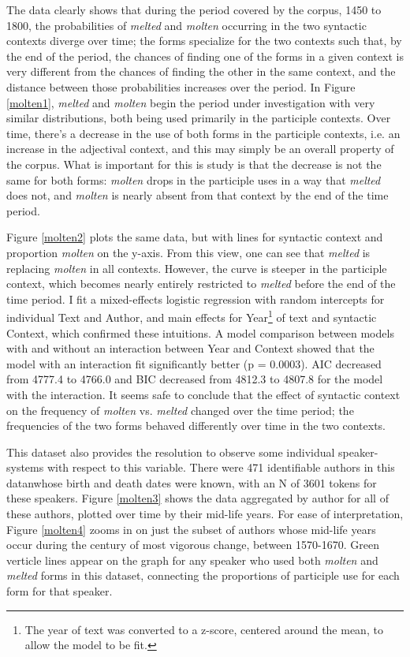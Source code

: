 \documentclass{artikel3}
\begin{document}
The data clearly shows that during the period covered by the corpus, 1450 to 1800, the probabilities of \textsl{melted} and \textsl{molten} occurring in the two syntactic contexts diverge over time; the forms specialize for the two contexts such that, by the end of the period, the chances of finding one of the forms in a given context is very different from the chances of finding the other in the same context, and the distance between those probabilities increases over the period. In Figure \ref{molten1}, \textsl{melted} and \textsl{molten} begin the period under investigation with very similar distributions, both being used primarily in the participle contexts. Over time, there's a decrease in the use of both forms in the participle contexts, i.e. an increase in the adjectival context, and this may simply be an overall property of the corpus. What is important for this is study is that the decrease is not the same for both forms: \textsl{molten} drops in the participle uses in a way that \textsl{melted} does not, and \textsl{molten} is nearly absent from that context by the end of the time period.

Figure \ref{molten2} plots the same data, but with lines for syntactic context and proportion \textsl{molten} on the y-axis. From this view, one can see that \textsl{melted} is replacing \textsl{molten} in all contexts. However, the curve is steeper in the participle context, which becomes nearly entirely restricted to \textsl{melted} before the end of the time period. I fit a mixed-effects logistic regression with random intercepts for individual Text and Author, and main effects for Year\footnote{The year of text was converted to a z-score, centered around the mean, to allow the model to be fit.} of text and syntactic Context, which confirmed these intuitions. A model comparison between models with and without an interaction between Year and Context showed that the model with an interaction fit significantly better (p = 0.0003). AIC decreased from 4777.4 to 4766.0 and BIC decreased from 4812.3 to 4807.8 for the model with the interaction. It seems safe to conclude that the effect of syntactic context on the frequency of \textsl{molten} vs. \textsl{melted} changed over the time period; the frequencies of the two forms behaved differently over time in the two contexts.

This dataset also provides the resolution to observe some individual speaker-systems with respect to this variable. There were 471 identifiable authors in this datanwhose birth and death dates were known, with an N of 3601 tokens for these speakers. Figure \ref{molten3} shows the data aggregated by author for all of these authors, plotted over time by their mid-life years. For ease of interpretation, Figure \ref{molten4} zooms in on just the subset of authors whose mid-life years occur during the century of most vigorous change, between 1570-1670. Green verticle lines appear on the graph for any speaker who used both \textsl{molten} and \textsl{melted} forms in this dataset, connecting the proportions of participle use for each form for that speaker.
\end{document}
